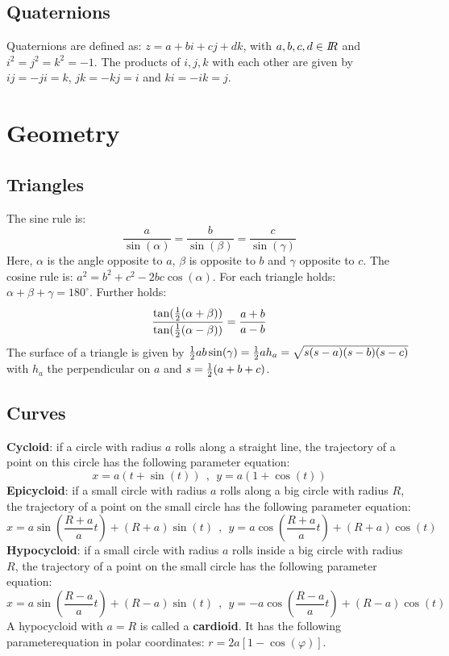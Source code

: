\documentclass[twoside]{report}
\begin{document}
\subsection{Quaternions}
Quaternions are defined as: $z=a+bi+cj+dk$, with $a,b,c,d\in I\hspace{-1mm}R$ and
$i^2=j^2=k^2=-1$. The products of $i,j,k$ with each other are given by
$ij=-ji=k$, $jk=-kj=i$ and $ki=-ik=j$.

\section{Geometry}
\subsection{Triangles}
The sine rule is:
\[
\frac{a}{\sin(\alpha)}=\frac{b}{\sin(\beta)}=\frac{c}{\sin(\gamma)}
\]
Here, $\alpha$ is the angle opposite to $a$, $\beta$ is opposite to $b$ and
$\gamma$ opposite to $c$. The cosine rule is: $a^2=b^2+c^2-2bc\cos(\alpha)$.
For each triangle holds: $\alpha+\beta+\gamma=180^\circ$.
\npar
Further holds:
\[
\frac{\tan(\mbox{$\frac{1}{2}$}(\alpha+\beta))}{\tan(\mbox{$\frac{1}{2}$}(\alpha-\beta))}=\frac{a+b}{a-b}
\]
The surface of a triangle is given by $\mbox{$\frac{1}{2}$} ab\sin(\gamma)=\mbox{$\frac{1}{2}$} ah_a=\sqrt{s(s-a)(s-b)(s-c)}$
with $h_a$ the perpendicular on $a$ and $s=\mbox{$\frac{1}{2}$}(a+b+c)$.

\subsection{Curves}
{\bf Cycloid}: if a circle with radius $a$ rolls along a straight line, the
trajectory of a point on this circle has the following parameter equation:
\[
x=a(t+\sin(t))~~,~~y=a(1+\cos(t))
\]
{\bf Epicycloid}: if a small circle with radius $a$ rolls along a big circle
with radius $R$, the trajectory of a point on the small circle has the
following parameter equation:
\[
x=a\sin\left(\frac{R+a}{a}t\right)+(R+a)\sin(t)~~,~~
y=a\cos\left(\frac{R+a}{a}t\right)+(R+a)\cos(t)
\]
{\bf Hypocycloid}: if a small circle with radius $a$ rolls inside a big circle
with radius $R$, the trajectory of a point on the small circle has the
following parameter equation:
\[
x=a\sin\left(\frac{R-a}{a}t\right)+(R-a)\sin(t)~~,~~
y=-a\cos\left(\frac{R-a}{a}t\right)+(R-a)\cos(t)
\]
A hypocycloid with $a=R$ is called a {\bf cardioid}. It has the following
parameterequation in polar coordinates: $r=2a[1-\cos(\varphi)]$.
\end{document}
